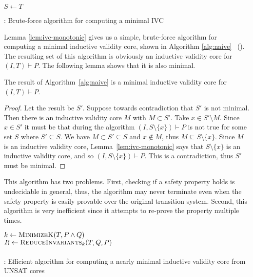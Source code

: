 

\begin{algorithm}[t]
  \BlankLine
  $S \leftarrow T$ \\
   {
  }
\caption{\bfalg: Brute-force algorithm for computing a minimal IVC}
\label{alg:naive}
\end{algorithm}

Lemma \ref{lem:ivc-monotonic} gives us a simple, brute-force algorithm for computing
a minimal inductive validity core, shown in Algorithm \ref{alg:naive} ~(\bfalg). The
resulting set of this algorithm is obviously an inductive validity
core for $(I, T)\vdash P$. The following lemma shows that it is also
minimal.

\begin{lemma}
  The result of Algorithm~\ref{alg:naive} is a minimal inductive validity core
  for $(I, T)\vdash P$.
\end{lemma}
\begin{proof}
  Let the result be $S'$. Suppose towards contradiction that $S'$ is not
  minimal. Then there is an inductive validity core $M$ with $M
  \subset S'$. Take $x \in S'\setminus M$. Since $x \in S'$ it must be
  that during the algorithm $(I, S\setminus\{x\})\vdash P$ is not true
  for some set $S$ where $S' \subseteq S$. We have $M \subset S'
  \subseteq S$ and $x\not\in M$, thus $M \subseteq S\setminus \{x\}$.
  Since $M$ is an inductive validity core,
  Lemma~\ref{lem:ivc-monotonic} says that $S\setminus \{x\}$ is an
  inductive validity core, and so $(I, S\setminus\{x\})\vdash P$. This
  is a contradiction, thus $S'$ must be minimal.
\end{proof}

This algorithm has two problems. First, checking if a safety property
holds is undecidable in general, thus, the algorithm may never terminate
even when the safety property is easily provable over the original
transition system. Second, this algorithm is very inefficient since it
attempts to re-prove the property multiple times.

\begin{algorithm}[t]
  \BlankLine
  $k \leftarrow \textsc{MinimizeK}(T, P \land Q)$ \\
  $R \leftarrow \textsc{ReduceInvariants}_k(T, Q, P)$ \\
  \\
\caption{\ucalg: Efficient algorithm for computing a nearly minimal inductive validity core from UNSAT cores}
\label{alg:ivc}
\end{algorithm}

